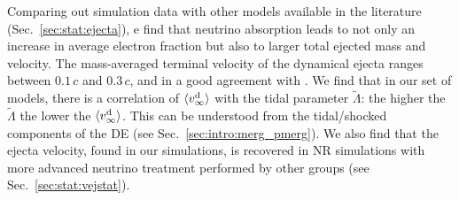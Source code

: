 %
Comparing out simulation data with other models available in the literature 
(Sec.~\ref{sec:stat:ejecta}), e find that neutrino absorption leads to not only 
an increase in average electron fraction but also to larger total ejected mass 
and velocity. 
The mass-averaged terminal velocity of the dynamical ejecta 
ranges between $0.1\,c$ and $0.3\,c$, and in a good agreement with 
\citep{Radice:2018pdn}.
%
We find that in our set of models, there is a correlation of $\langle v^{\text{d}}_\infty\rangle$ with the 
tidal parameter $\tilde{\Lambda}$: the higher the $\tilde{\Lambda}$ the lower 
the $\langle v^{\text{d}}_\infty\rangle$. This can be understood from the tidal/shocked components of the 
\ac{DE} (see Sec.~\ref{sec:intro:merg_pmerg}).
%
We also find that the ejecta velocity, found in our simulations, 
is recovered in \ac{NR} simulations with more advanced neutrino 
treatment performed by other groups (see Sec.~\ref{sec:stat:vejstat}).
%
%
